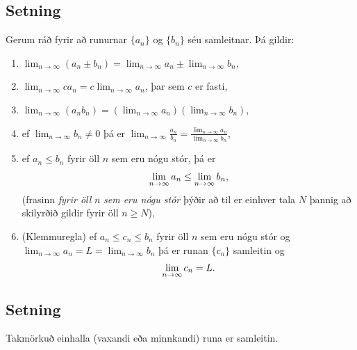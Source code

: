 \documentclass[a4paper,10pt,icelandic]{sphinxmanual}
\begin{document}
\subsection{Setning}
\label{kafli09:id4}
Gerum ráð fyrir að runurnar \(\{a_n\}\) og \(\{b_n\}\) séu
samleitnar. Þá gildir:
\begin{enumerate}
\item {} 
\(\lim_{n\rightarrow\infty}(a_n\pm b_n)=
\lim_{n\rightarrow\infty}a_n\pm\lim_{n\rightarrow\infty}b_n\),

\item {} 
\(\lim_{n\rightarrow\infty}ca_n=
c\lim_{n\rightarrow\infty}a_n\), þar sem \(c\) er fasti,

\item {} 
\(\lim_{n\rightarrow\infty}(a_n b_n)=
(\lim_{n\rightarrow\infty}a_n)(\lim_{n\rightarrow\infty}b_n)\),

\item {} 
ef \(\lim_{n\rightarrow\infty}b_n\neq 0\) þá er
\(\lim_{n\rightarrow\infty}\frac{a_n}{b_n}=
\frac{\lim_{n\rightarrow\infty}a_n}{\lim_{n\rightarrow\infty}b_n}\),

\item {} 
ef \(a_n\leq b_n\) fyrir öll \(n\) sem eru nógu stór, þá
er
\begin{gather}
\begin{split}\lim_{n\rightarrow\infty}a_n\leq\lim_{n\rightarrow\infty}b_n,\end{split}\notag
\end{gather}
(frasinn \emph{fyrir öll} \(n\) \emph{sem eru nógu stór} þýðir að til er
einhver tala \(N\) þannig að skilyrðið gildir fyrir öll
\(n\geq N\)),

\item {} 
(Klemmuregla) ef \(a_n\leq c_n\leq b_n\) fyrir öll \(n\)
sem eru nógu stór og
\(\lim_{n\rightarrow\infty}a_n=L=\lim_{n\rightarrow\infty}b_n\)
þá er runan \(\{c_n\}\) samleitin og
\begin{gather}
\begin{split}\lim_{n\rightarrow\infty}c_n=L.\end{split}\notag
\end{gather}
\end{enumerate}


\subsection{Setning}
\label{kafli09:id5}
Takmörkuð einhalla (vaxandi eða minnkandi) runa er samleitin.
\end{document}
